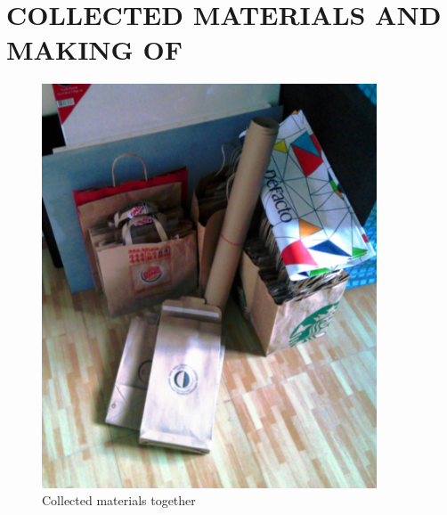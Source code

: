 \chapter{COLLECTED MATERIALS AND MAKING OF}

\begin{figure}[h!]
  \centering
  \includegraphics[height=12cm]{project_graphics/collected_all_together.jpg}
  \caption{Collected materials together}
  \label{fig:CollectedAllTogether}
\end{figure}


